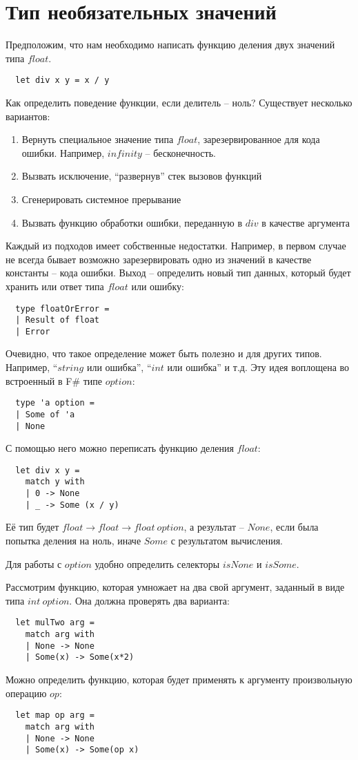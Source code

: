 \documentclass[a4paper,11pt]{article}
\begin{document}
\section{Тип необязательных значений}
Предположим, что нам необходимо написать функцию деления двух значений типа
$float$. 
\begin{lstlisting}
  let div x y = x / y
\end{lstlisting}
Как определить поведение функции, если делитель -- ноль? Существует
несколько вариантов:
\begin{enumerate}
\item Вернуть специальное значение типа $float$, зарезервированное для кода
  ошибки. Например, $infinity$ -- бесконечность.
\item Вызвать исключение, ``развернув'' стек вызовов функций
\item Сгенерировать системное прерывание
\item Вызвать функцию обработки ошибки, переданную в $div$ в качестве аргумента
\end{enumerate}

Каждый из подходов имеет собственные недостатки. Например, в первом случае
не всегда бывает возможно зарезервировать одно из значений в качестве
константы -- кода ошибки. Выход -- определить новый тип данных, который будет
хранить или ответ типа $float$ или ошибку:
\begin{lstlisting}
  type floatOrError =
  | Result of float
  | Error
\end{lstlisting}
Очевидно, что такое определение может быть полезно и для других типов. Например,
``$string$ или ошибка'', ``$int$ или ошибка'' и т.д. Эту идея воплощена во
встроенный в F\# типе $option$:
\begin{lstlisting}
  type 'a option =
  | Some of 'a
  | None
\end{lstlisting}
С помощью него можно переписать функцию деления $float$:
\begin{lstlisting}
  let div x y =
    match y with 
    | 0 -> None
    | _ -> Some (x / y)
\end{lstlisting}
Её тип будет $float \rightarrow float \rightarrow float~option$, а результат --
$None$, если была попытка деления на ноль, иначе $Some$ с результатом вычисления.

Для работы с $option$ удобно определить селекторы $isNone$ и $isSome$.

Рассмотрим функцию, которая умножает на два свой аргумент, заданный в виде типа
$int~option$. Она должна проверять два варианта:
\begin{lstlisting}
  let mulTwo arg =
    match arg with
    | None -> None
    | Some(x) -> Some(x*2)
\end{lstlisting}
Можно определить функцию, которая будет применять к аргументу произвольную 
операцию $op$:
\begin{lstlisting}
  let map op arg =
    match arg with
    | None -> None
    | Some(x) -> Some(op x)
\end{lstlisting}
\end{document}
